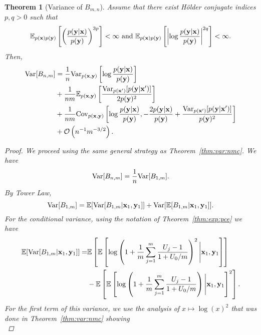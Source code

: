 \documentclass[a4paper, 10pt]{report}
\theoremstyle{plain}
\newtheorem{theorem}{Theorem}[chapter]
\begin{document}
	\begin{theorem}[Variance of $B_{m,n}$]\label{thm:var:pce}
		Assume that there exist H\"{o}lder conjugate indices  $p,q > 0$ such that
		\begin{equation}
		\mathbb{E}_{p({\mathbf{x}})p({\mathbf{y}})}\left[\left(\frac{p({\mathbf{y}}|{\mathbf{x}})}{p({\mathbf{y}})}\right)^{3p} \right]<\infty \text{  and  } \mathbb{E}_{p({\mathbf{x}})p({\mathbf{y}})}\left[\left|  \log \frac{p({\mathbf{y}}|{\mathbf{x}})}{p({\mathbf{y}})} \right|^{2q}\right]<\infty.
		\end{equation}
		Then,
		\begin{equation}
		\begin{split}
		\mathrm{Var}[B_{n,m}] &= \frac{1}{n}\mathrm{Var}_{p({\mathbf{x}},{\mathbf{y}})}\left[ \log \frac{p({\mathbf{y}}|{\mathbf{x}})}{p({\mathbf{y}})} \right] \\
		& + \frac{1}{nm}\mathbb{E}_{p({\mathbf{x}},{\mathbf{y}})}\left[ \frac{\mathrm{Var}_{p({\mathbf{x}}')}[p({\mathbf{y}}|{\mathbf{x}}')]}{2p({\mathbf{y}})^2} \right] \\
		& + \frac{1}{nm} \mathrm{Cov}_{p({\mathbf{x}},{\mathbf{y}})}\left[ \log\frac{p({\mathbf{y}}|{\mathbf{x}})}{p({\mathbf{y}})} ,  - \frac{2p({\mathbf{y}}|{\mathbf{x}})}{p({\mathbf{y}})} +  \frac{\mathrm{Var}_{p({\mathbf{x}}')}[p({\mathbf{y}}|{\mathbf{x}}')]}{p({\mathbf{y}})^2}  \right] \\
		& + \mathcal{O}\left(n^{-1}m^{-3/2}\right).
		\end{split}
		\end{equation}
		\begin{proof}
			We proceed using the same general strategy as Theorem~\ref{thm:var:nmc}.
			We have
			\begin{equation}
			\mathrm{Var}[B_{n,m}]=\frac{1}{n}\mathrm{Var}[B_{1,m}].
			\end{equation}
			By Tower Law,
			\begin{equation}
			\mathrm{Var}[B_{1,m}] = \mathbb{E}[\mathrm{Var}[B_{1,m}|{\mathbf{x}}_1,{\mathbf{y}}_1]] + \mathrm{Var}[\mathbb{E}[B_{1,m}|{\mathbf{x}}_1,{\mathbf{y}}_1]].
			\end{equation}
			For the conditional variance, using the notation of Theorem~\ref{thm:exp:pce} we have
			\begin{equation}
			\begin{split}
			\mathbb{E}[\mathrm{Var}[B_{1,m}|{\mathbf{x}}_1,{\mathbf{y}}_1]] =& \mathbb{E}\left[ \mathbb{E}\left[ \log\left(1 + \frac{1}{m}\sum_{j=1}^m \frac{U_j - 1}{1 + U_0/m} \right)^2 \Bigg{|} {\mathbf{x}}_1,{\mathbf{y}}_1 \right] \right]\\
			&-\mathbb{E}\left[ \mathbb{E}\left[ \log\left(1 + \frac{1}{m}\sum_{j=1}^m \frac{U_j - 1}{1 + U_0/m} \right) \Bigg{|} {\mathbf{x}}_1,{\mathbf{y}}_1 \right]^2 \right].
			\end{split}
			\end{equation}
			For the first term of this variance, we use the analysis of $x\mapsto \log(x)^2$ that was done in Theorem~\ref{thm:var:nmc} showing
			\begin{equation}

\end{equation}
\end{proof}
\end{theorem}
\end{document}
